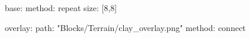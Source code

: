 base:
  method: repeat
  size: [8,8]

overlay:
  path: "Blocks/Terrain/clay_overlay.png"
  method: connect